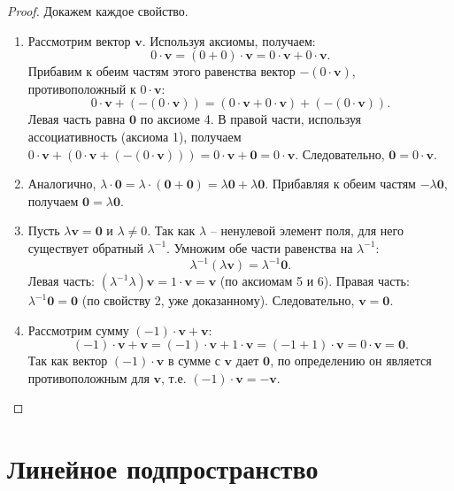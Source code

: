 \documentclass[10pt]{article}
\begin{document}
\begin{proof}
Докажем каждое свойство.
\begin{enumerate}
    \item Рассмотрим вектор \(\mathbf{v}\). Используя аксиомы, получаем:
    \[
    0\cdot\mathbf{v} = (0+0)\cdot\mathbf{v} = 0\cdot\mathbf{v} + 0\cdot\mathbf{v}.
    \]
    Прибавим к обеим частям этого равенства вектор \(-(0\cdot\mathbf{v})\), противоположный к \(0\cdot\mathbf{v}\):
    \[
    0\cdot\mathbf{v} + (-(0\cdot\mathbf{v})) = (0\cdot\mathbf{v} + 0\cdot\mathbf{v}) + (-(0\cdot\mathbf{v})).
    \]
    Левая часть равна \(\mathbf{0}\) по аксиоме 4. В правой части, используя ассоциативность (аксиома 1), получаем \(0\cdot\mathbf{v} + (0\cdot\mathbf{v} + (-(0\cdot\mathbf{v}))) = 0\cdot\mathbf{v} + \mathbf{0} = 0\cdot\mathbf{v}\). Следовательно, \(\mathbf{0} = 0\cdot\mathbf{v}\).

    \item Аналогично, \(\lambda \cdot \mathbf{0} = \lambda \cdot (\mathbf{0} + \mathbf{0}) = \lambda\mathbf{0} + \lambda\mathbf{0}\). Прибавляя к обеим частям \(-\lambda\mathbf{0}\), получаем \(\mathbf{0} = \lambda\mathbf{0}\).

    \item Пусть \(\lambda\mathbf{v} = \mathbf{0}\) и \(\lambda \neq 0\). Так как \(\lambda\) -- ненулевой элемент поля, для него существует обратный \(\lambda^{-1}\). Умножим обе части равенства на \(\lambda^{-1}\):
    \[
    \lambda^{-1}(\lambda\mathbf{v}) = \lambda^{-1}\mathbf{0}.
    \]
    Левая часть: \((\lambda^{-1}\lambda)\mathbf{v} = 1\cdot\mathbf{v} = \mathbf{v}\) (по аксиомам 5 и 6). Правая часть: \(\lambda^{-1}\mathbf{0} = \mathbf{0}\) (по свойству 2, уже доказанному). Следовательно, \(\mathbf{v} = \mathbf{0}\).

    \item Рассмотрим сумму \((-1)\cdot\mathbf{v} + \mathbf{v}\):
    \[
    (-1)\cdot\mathbf{v} + \mathbf{v} = (-1)\cdot\mathbf{v} + 1\cdot\mathbf{v} = (-1 + 1)\cdot\mathbf{v} = 0\cdot\mathbf{v} = \mathbf{0}.
    \]
    Так как вектор \((-1)\cdot\mathbf{v}\) в сумме с \(\mathbf{v}\) дает \(\mathbf{0}\), по определению он является противоположным для \(\mathbf{v}\), т.е. \((-1)\cdot\mathbf{v} = -\mathbf{v}\).
\end{enumerate}
\end{proof}

\section{Линейное подпространство}
\end{document}
